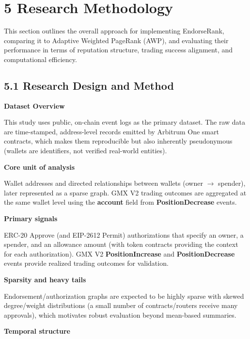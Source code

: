 \clearpage
{}
\section*{5 \textbf{Research Methodology}}
\label{sec:research-methodology}

This section outlines the overall approach for implementing EndorseRank, comparing it to Adaptive Weighted PageRank (AWP), and evaluating their performance in terms of reputation structure, trading success alignment, and computational efficiency.


\subsection*{5.1 Research Design and Method}
\label{sec:research-design-and-method}

\textbf{Dataset Overview}


This study uses public, on-chain event logs as the primary dataset. The raw data are time-stamped, address-level records emitted by Arbitrum One smart contracts, which makes them reproducible but also inherently pseudonymous (wallets are identifiers, not verified real-world entities).


\textbf{Core unit of analysis}


Wallet addresses and directed relationships between wallets (owner \(\to\) spender), later represented as a sparse graph. GMX V2 trading outcomes are aggregated at the same wallet level using the \textbf{account} field from \textbf{PositionDecrease} events.


\textbf{Primary signals}


ERC-20 Approve (and EIP-2612 Permit) authorizations that specify an owner, a spender, and an allowance amount (with token contracts providing the context for each authorization). GMX V2 \textbf{PositionIncrease} and \textbf{PositionDecrease} events provide realized trading outcomes for validation.


\textbf{Sparsity and heavy tails}


Endorsement/authorization graphs are expected to be highly sparse with skewed degree/weight distributions (a small number of contracts/routers receive many approvals), which motivates robust evaluation beyond mean-based summaries.


\textbf{Temporal structure}


